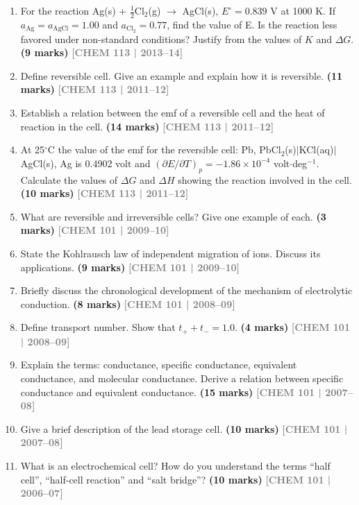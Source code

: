 \documentclass[12pt,a3paper]{article}
\newcommand{\yr}[1]{\hfill\textcolor{gray}{\small\textbf{[#1]}}}
\newcommand{\mk}[1]{\textcolor{orange!70!black}{\small\textbf{(#1 marks)}}}
\begin{document}
\begin{enumerate}
\item For the reaction Ag(s) + $\frac{1}{2}$Cl$_2$(g) $\rightarrow$ AgCl(s), $E^\circ = 0.839$ V at 1000 K. If $a_{\text{Ag}} = a_{\text{AgCl}} = 1.00$ and $a_{\text{Cl}_2} = 0.77$, find the value of E. Is the reaction less favored under non-standard conditions? Justify from the values of $K$ and $\Delta G$. \mk{9}
\yr{CHEM 113 | 2013--14}



\item Define reversible cell. Give an example and explain how it is reversible. \mk{11}
\yr{CHEM 113 | 2011--12}



\item Establish a relation between the emf of a reversible cell and the heat of reaction in the cell. \mk{14}
\yr{CHEM 113 | 2011--12}



\item At 25$^\circ$C the value of the emf for the reversible cell: Pb, PbCl$_2$(s)$|$KCl(aq)$|$AgCl(s), Ag is 0.4902 volt and $(\partial E / \partial T)_p = -1.86 \times 10^{-4}$ volt$\cdot$deg$^{-1}$. Calculate the values of $\Delta G$ and $\Delta H$ showing the reaction involved in the cell. \mk{10}
\yr{CHEM 113 | 2011--12}



\item What are reversible and irreversible cells? Give one example of each. \mk{3}
\yr{CHEM 101 | 2009--10}



\item State the Kohlrausch law of independent migration of ions. Discuss its applications. \mk{9}
\yr{CHEM 101 | 2009--10}



\item Briefly discuss the chronological development of the mechanism of electrolytic conduction. \mk{8}
\yr{CHEM 101 | 2008--09}



\item Define transport number. Show that $t_+ + t_- = 1.0$. \mk{4}
\yr{CHEM 101 | 2008--09}



\item Explain the terms: conductance, specific conductance, equivalent conductance, and molecular conductance. Derive a relation between specific conductance and equivalent conductance. \mk{15}
\yr{CHEM 101 | 2007--08}



\item Give a brief description of the lead storage cell. \mk{10}
\yr{CHEM 101 | 2007--08}

\item What is an electrochemical cell? How do you understand the terms ``half cell'', ``half-cell reaction'' and ``salt bridge''? \mk{10}
\yr{CHEM 101 | 2006--07}



\end{enumerate}
\end{document}
